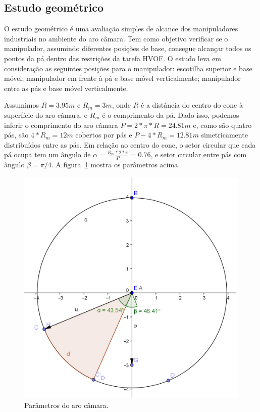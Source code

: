 \subsection{Estudo geométrico}
O estudo geométrico é uma avaliação simples de alcance dos manipuladores
industriais no ambiente do aro câmara. Tem como objetivo verificar se o
manipulador, assumindo diferentes posições de base, consegue alcançar
todos os pontos da pá dentro das restrições da tarefa HVOF. O estudo leva em
consideração as seguintes posições para o manipulador: escotilha superior e base
móvel; manipulador em frente à pá e base móvel verticalmente; manipulador entre
as pás e base móvel verticalmente. 

Assumimos $R = 3.95 m$ e $R_m = 3 m$, onde $R$ é a distância do centro do cone à
superfície do aro câmara, e $R_m$ é o comprimento da pá. Dado isso, podemos
inferir o comprimento do aro câmara $P = 2*\pi *R = 24.81 m$ e, como são quatro
pás, são $4*R_m = 12 m$ cobertos por pás e $P-4*R_m = 12.81 m$ simetricamente
distribuídos entre as pás. Em relação ao centro do cone, o setor circular que
cada pá ocupa tem um ângulo de $\alpha = \frac{R_m*2*\pi}{P} = 0.76$, e setor
circular entre pás com ângulo $\beta = \pi/4$. A
figura~\ref{pa} mostra os parâmetros acima.

\begin{figure}[h!]
\centering
	\includegraphics[width=\columnwidth]{figs/estudo/geometrico/pa.png} 
	\caption{Parâmetros do aro câmara.}
	\label{pa}
\end{figure}

